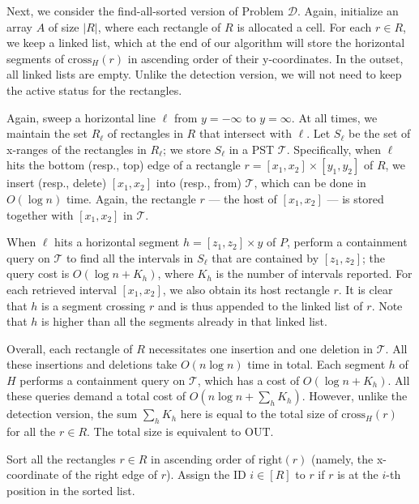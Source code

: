 \documentclass[sigconf]{acmart}
\def\vgap{\vspace{0mm}}
\def\extraspacing{\vspace{1.5mm} \noindent}
\def\T{\mathcal{T}}
\def\xright{\mathrm{right}}
\def\cross{\mathrm{cross}}
\def\out{\mathrm{OUT}}
\begin{document}
{{{\vgap

Next, we consider the find-all-sorted version of Problem $\mathscr{D}$. Again, initialize an array $A$ of size $|R|$, where each rectangle of $R$ is allocated a cell. For each $r \in R$, we keep a linked list, which at the end of our algorithm will store the horizontal segments of $\cross_H(r)$ in ascending order of their y-coordinates. In the outset, all linked lists are empty. Unlike the detection version, we will not need to keep the active status for the rectangles.

\vgap

Again, sweep a horizontal line $\ell$ from $y = -\infty$ to $y = \infty$. At all times, we maintain the set $R_\ell$ of rectangles in $R$ that intersect with $\ell$. Let $S_\ell$ be the set of x-ranges of the rectangles in $R_\ell$; we store $S_\ell$ in a PST $\T$. Specifically, when $\ell$ hits the bottom (resp., top) edge of a rectangle $r = [x_1, x_2] \times [y_1, y_2]$ of $R$, we insert (resp., delete) $[x_1, x_2]$ into (resp., from) $\T$, which can be done in $O(\log n)$ time. Again, the rectangle $r$ --- the host of $[x_1, x_2]$ --- is stored together with $[x_1, x_2]$ in $\T$.

\vgap

When $\ell$ hits a horizontal segment $h = [z_1, z_2] \times y$ of $P$, perform a containment query on $\T$ to find all the intervals in $S_\ell$ that are contained by $[z_1, z_2]$; the query cost is $O(\log n + K_h)$, where $K_h$ is the number of intervals reported. For each retrieved interval $[x_1, x_2]$, we also obtain its host rectangle $r$. It is clear that $h$ is a segment crossing $r$ and is thus appended to the linked list of $r$. Note that $h$ is higher than all the segments already in that linked list.

\vgap

Overall, each rectangle of $R$ necessitates one insertion and one deletion in $\T$. All these insertions and deletions take $O(n \log n)$ time in total. Each segment $h$ of $H$ performs a containment query on $\T$, which has a cost of $O(\log n + K_h)$. All these queries demand a total cost of $O(n \log n + \sum_h K_h)$. However, unlike the detection version, the sum $\sum_h K_h$ here is equal to the total size of $\cross_H(r)$ for all the $r \in R$. The total size is equivalent to $\out$.


\extraspacing {\bf Algorithm for Problem $\bm{\mathscr{E}}$.} Sort all the rectangles $r \in R$ in ascending order of $\xright(r)$ (namely, the x-coordinate of the right edge of $r$). Assign the ID $i \in [R]$ to $r$ if $r$ is at the $i$-th position in the sorted list.

}}}
\end{document}

